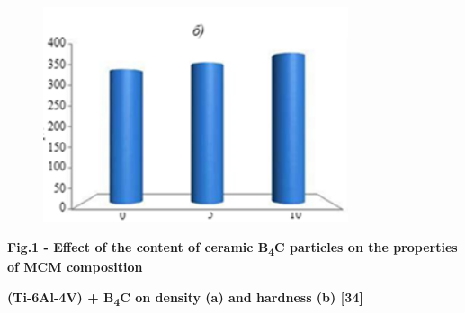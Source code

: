 \begin{figure}[H]
	\centering
	\includegraphics[width=0.8\textwidth]{media/chem/image7}
	\caption*{}
\end{figure}


{\bfseries Fig.1 - Effect of the content of ceramic B\textsubscript{4}C
particles on the properties of MCM composition}

{\bfseries (Ti-6Al-4V) + B\textsubscript{4}C on density (a) and hardness
(b) {[}34{]}}

